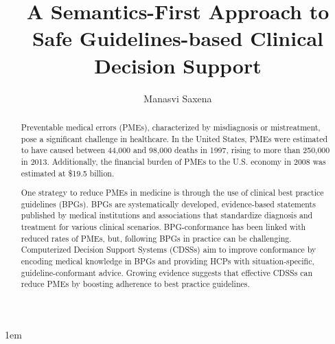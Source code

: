 \documentclass[edeposit,tocnosub,noragright,centerchapter,fullpagesingle,12pt]{uiuc_csthesis21}
\title{A Semantics-First Approach to Safe Guidelines-based Clinical Decision Support}
\author{Manasvi Saxena}
\theoremstyle{definition}
\numberwithin{algocf}{chapter}     %
\begin{document}
%

%
\maketitle

\parindent 1em%

\frontmatter


\begin{abstract}
  Preventable medical errors (PMEs), characterized by misdiagnosis or mistreatment,
  pose a significant challenge in healthcare.
  In the United States, PMEs were estimated to have caused between
  44,000 and 98,000 deaths in 1997,
  rising to more than 250,000 in 2013. Additionally, the
  financial burden of PMEs to the U.S. economy in 2008 was estimated at \$19.5 billion.

  One strategy to reduce PMEs in medicine is through the use of
  clinical best practice guidelines (BPGs). BPGs are systematically developed,
  evidence-based statements published by medical institutions and associations
  that standardize diagnosis and treatment for various clinical scenarios.
  BPG-conformance has been linked with reduced rates of PMEs, but,
  following BPGs in practice can be challenging.
  Computerized Decision Support Systems (CDSSs) aim to improve conformance
  by encoding medical knowledge in BPGs and providing HCPs with
  situation-specific, guideline-conformant advice.
  Growing evidence suggests that
  effective CDSSs can reduce PMEs by boosting adherence to best practice guidelines.


\end{abstract}
\end{document}
